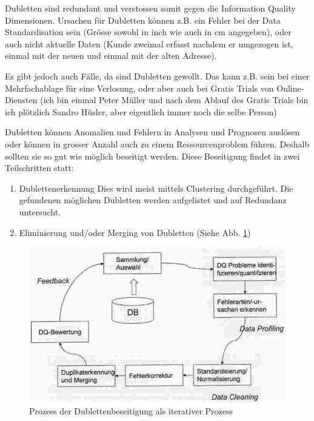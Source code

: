 \documentclass[a4paper, 11pt, nofootinbib]{article}
\begin{document}
Dubletten sind redundant und verstossen somit gegen die Information Quality Dimensionen. Ursachen für Dubletten können z.B. ein Fehler bei der Data Standardisation sein (Grösse sowohl in inch wie auch in cm angegeben), oder auch nicht aktuelle Daten (Kunde zweimal erfasst nachdem er umgezogen ist, einmal mit der neuen und einmal mit der alten Adresse).

Es gibt jedoch auch Fälle, da sind Dubletten gewollt. Das kann z.B. sein bei einer Mehrfachablage für eine Verlosung, oder aber auch bei Gratis Trials von Online-Diensten (ich bin einmal Peter Müller und nach dem Ablauf des Gratis Trials bin ich plötzlich Sandro Hüsler, aber eigentlich immer noch die selbe Person)

Dubletten können Anomalien und Fehlern in Analysen und Prognosen auslösen oder können in grosser Anzahl auch zu einem Ressourcenproblem führen. Deshalb sollten sie so gut wie möglich beseitigt werden. Diese Beseitigung findet in zwei Teilschritten statt:

\begin{enumerate}
	\item Dublettenerkennung Dies wird meist mittels Clustering durchgeführt. Die gefundenen möglichen Dubletten werden aufgelistet und auf Redundanz untersucht.
	\item Eliminierung und/oder Merging von Dubletten (Siehe Abb. \ref{fig:dubl})
\end{enumerate}

\begin{figure}[htb!]
	\centering
	\includegraphics[keepaspectratio=true,height=14\baselineskip]{DublettenBeseitigung.jpg}
	\caption{Prozess der Dublettenbeseitigung als iterativer Prozess}
	\label{fig:dubl}
\end{figure}
\end{document}

